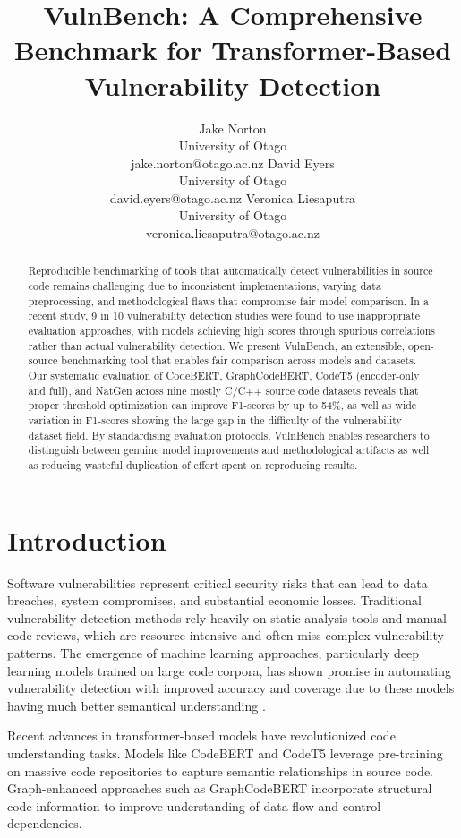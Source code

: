 \documentclass[letterpaper]{article}
\title{VulnBench: A Comprehensive Benchmark for Transformer-Based Vulnerability Detection}
\author{
Jake Norton\\
University of Otago\\
jake.norton@otago.ac.nz
\And
David Eyers\\
University of Otago\\
david.eyers@otago.ac.nz
\And
Veronica Liesaputra\\
University of Otago\\
veronica.liesaputra@otago.ac.nz
}
\begin{document}
\maketitle

\begin{abstract}
	Reproducible benchmarking of tools that automatically detect vulnerabilities in source code remains challenging due to inconsistent implementations, varying data preprocessing, and methodological flaws that compromise fair model comparison. In a recent study, 9 in 10 vulnerability detection studies were found to use inappropriate evaluation approaches, with models achieving high scores through spurious correlations rather than actual vulnerability detection. We present VulnBench, an extensible, open-source benchmarking tool that enables fair comparison across models and datasets. Our systematic evaluation of CodeBERT, GraphCodeBERT, CodeT5 (encoder-only and full), and NatGen across nine mostly C/C++ source code datasets reveals that proper threshold optimization can improve F1-scores by up to 54\%, as well as wide variation in F1-scores showing the large gap in the difficulty of the vulnerability dataset field. By standardising evaluation protocols, VulnBench enables researchers to distinguish between genuine model improvements and methodological artifacts as well as reducing wasteful duplication of effort spent on reproducing results.
\end{abstract}


\section{Introduction}

Software vulnerabilities represent critical security risks that can lead to data breaches, system compromises, and substantial economic losses. Traditional vulnerability detection methods rely heavily on static analysis tools and manual code reviews, which are resource-intensive and often miss complex vulnerability patterns. The emergence of machine learning approaches, particularly deep learning models trained on large code corpora, has shown promise in automating vulnerability detection with improved accuracy and coverage due to these models having much better semantical understanding \citep{systematic2024survey}.

Recent advances in transformer-based models have revolutionized code understanding tasks. Models like CodeBERT \citep{feng2020codebert} and CodeT5 \citep{wang2021codet5} leverage pre-training on massive code repositories to capture semantic relationships in source code. Graph-enhanced approaches such as GraphCodeBERT \citep{guo2021graphcodebert} incorporate structural code information to improve understanding of data flow and control dependencies.
\end{document}
